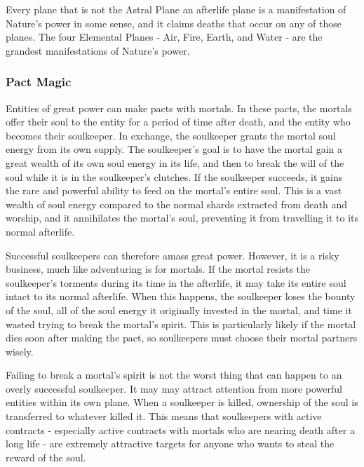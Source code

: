             Every plane that is not the Astral Plane an afterlife plane is a manifestation of Nature's power in some sense, and it claims deaths that occur on any of those planes.
            The four Elemental Planes - Air, Fire, Earth, and Water - are the grandest manifestations of Nature's power.

        \subsubsection{Pact Magic}
            Entities of great power can make pacts with mortals.
            In these pacts, the mortals offer their soul to the entity for a period of time after death, and the entity who becomes their soulkeeper.
            In exchange, the soulkeeper grants the mortal soul energy from its own supply.
            The soulkeeper's goal is to have the mortal gain a great wealth of its own soul energy in its life, and then to break the will of the soul while it is in the soulkeeper's clutches.
            If the soulkeeper succeeds, it gains the rare and powerful ability to feed on the mortal's entire soul.
            This is a vast wealth of soul energy compared to the normal shards extracted from death and worship, and it annihilates the mortal's soul, preventing it from travelling it to its normal afterlife.

            Successful soulkeepers can therefore amass great power.
            However, it is a risky business, much like adventuring is for mortals.
            If the mortal resists the soulkeeper's torments during its time in the afterlife, it may take its entire soul intact to its normal afterlife.
            When this happens, the soulkeeper loses the bounty of the soul, all of the soul energy it originally invested in the mortal, and time it wasted trying to break the mortal's spirit.
            This is particularly likely if the mortal dies soon after making the pact, so soulkeepers must choose their mortal partners wisely.

            Failing to break a mortal's spirit is not the worst thing that can happen to an overly successful soulkeeper.
            It may may attract attention from more powerful entities within its own plane.
            When a soulkeeper is killed, ownership of the soul is transferred to whatever killed it.
            This means that soulkeepers with active contracts - especially active contracts with mortals who are nearing death after a long life - are extremely attractive targets for anyone who wants to steal the reward of the soul.

